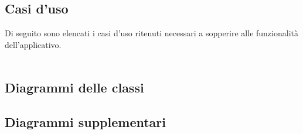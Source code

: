 \subsection{Casi d'uso}
Di seguito sono elencati i casi d'uso ritenuti necessari a sopperire alle funzionalità
dell'applicativo.
\\\\





\pagebreak


\pagebreak
\subsection{Diagrammi delle classi}





\pagebreak
\subsection{Diagrammi supplementari}

\pagebreak

\pagebreak

